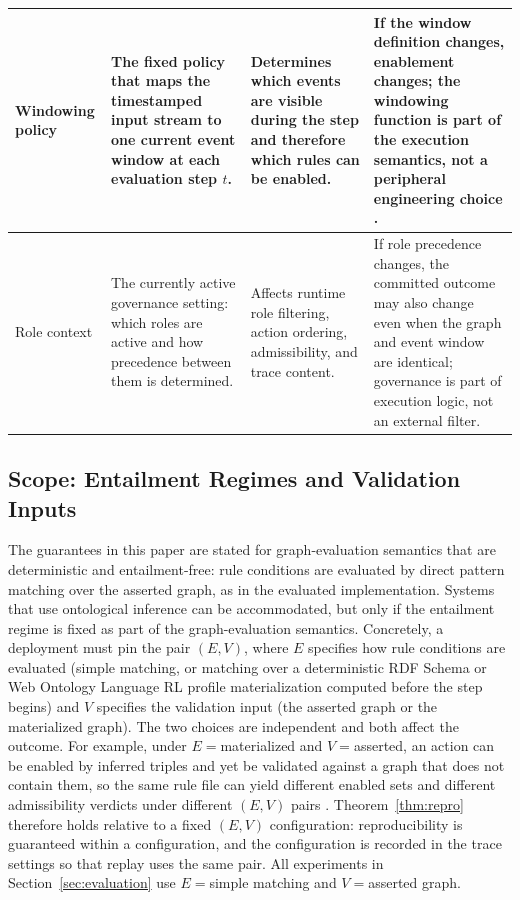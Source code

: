 \documentclass{ieeeaccess}
\theoremstyle{definition}
\theoremstyle{plain}
\theoremstyle{remark}
\begin{document}
\begin{table}[h]
\begin{tabular}{|p{2.6cm}|p{5.2cm}|p{4.3cm}|p{4.0cm}|}
\hline
Windowing policy & The fixed policy that maps the timestamped input stream to one current event window at each evaluation step $t$. & Determines which events are visible during the step and therefore which rules can be enabled. & If the window definition changes, enablement changes; the windowing function is part of the execution semantics, not a peripheral engineering choice \cite{Botan2010SECRET,DellAglio2014RSPQL}. \\
\hline
Role context & The currently active governance setting: which roles are active and how precedence between them is determined. & Affects runtime role filtering, action ordering, admissibility, and trace content. & If role precedence changes, the committed outcome may also change even when the graph and event window are identical; governance is part of execution logic, not an external filter. \\
\hline
\end{tabular}
\end{table}

\subsection{Scope: Entailment Regimes and Validation Inputs}
\label{sec:scope-entailment}

The guarantees in this paper are stated for graph-evaluation semantics that are deterministic and entailment-free: rule conditions are evaluated by direct pattern matching over the asserted graph, as in the evaluated implementation. Systems that use ontological inference can be accommodated, but only if the entailment regime is fixed as part of the graph-evaluation semantics. Concretely, a deployment must pin the pair $(E, V)$, where $E$ specifies how rule conditions are evaluated (simple matching, or matching over a deterministic RDF Schema or Web Ontology Language RL profile materialization computed before the step begins) and $V$ specifies the validation input (the asserted graph or the materialized graph). The two choices are independent and both affect the outcome. For example, under $E={}$materialized and $V={}$asserted, an action can be enabled by inferred triples and yet be validated against a graph that does not contain them, so the same rule file can yield different enabled sets and different admissibility verdicts under different $(E,V)$ pairs \cite{Corman2018RecursiveSHACL,Oudshoorn2026SHACLValidationOntologies}. Theorem~\ref{thm:repro} therefore holds relative to a fixed $(E,V)$ configuration: reproducibility is guaranteed within a configuration, and the configuration is recorded in the trace settings so that replay uses the same pair. All experiments in Section~\ref{sec:evaluation} use $E={}$simple matching and $V={}$asserted graph.
\end{document}
